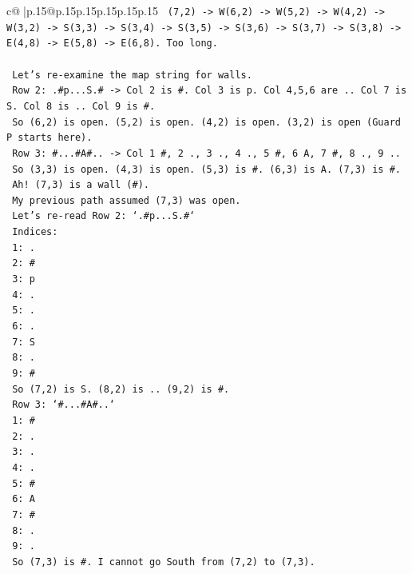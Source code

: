 \documentclass{article}
\begin{document}
{\begin{supertabular}{c@{$\;$}|p{.15\linewidth}@{}p{.15\linewidth}p{.15\linewidth}p{.15\linewidth}p{.15\linewidth}p{.15\linewidth}}
{{{\texttt{    (7,2) {-}> W(6,2) {-}> W(5,2) {-}> W(4,2) {-}> W(3,2) {-}> S(3,3) {-}> S(3,4) {-}> S(3,5) {-}> S(3,6) {-}> S(3,7) {-}> S(3,8) {-}> E(4,8) {-}> E(5,8) {-}> E(6,8). Too long.} \\
\\ 
\texttt{    Let's re{-}examine the map string for walls.} \\
\texttt{    Row 2: .\#p...S.\# {-}> Col 2 is \#. Col 3 is p. Col 4,5,6 are .. Col 7 is S. Col 8 is .. Col 9 is \#.} \\
\texttt{    So (6,2) is open. (5,2) is open. (4,2) is open. (3,2) is open (Guard P starts here).} \\
\texttt{    Row 3: \#...\#A\#.. {-}> Col 1 \#, 2 ., 3 ., 4 ., 5 \#, 6 A, 7 \#, 8 ., 9 ..} \\
\texttt{    So (3,3) is open. (4,3) is open. (5,3) is \#. (6,3) is A. (7,3) is \#.} \\
\texttt{    Ah! (7,3) is a wall (\#).} \\
\texttt{    My previous path assumed (7,3) was open.} \\
\texttt{    Let's re{-}read Row 2: `.\#p...S.\#`} \\
\texttt{    Indices:} \\
\texttt{    1: .} \\
\texttt{    2: \#} \\
\texttt{    3: p} \\
\texttt{    4: .} \\
\texttt{    5: .} \\
\texttt{    6: .} \\
\texttt{    7: S} \\
\texttt{    8: .} \\
\texttt{    9: \#} \\
\texttt{    So (7,2) is S. (8,2) is .. (9,2) is \#.} \\
\texttt{    Row 3: `\#...\#A\#..`} \\
\texttt{    1: \#} \\
\texttt{    2: .} \\
\texttt{    3: .} \\
\texttt{    4: .} \\
\texttt{    5: \#} \\
\texttt{    6: A} \\
\texttt{    7: \#} \\
\texttt{    8: .} \\
\texttt{    9: .} \\
\texttt{    So (7,3) is \#. I cannot go South from (7,2) to (7,3).} \\
}}}
\end{supertabular}}
\end{document}
